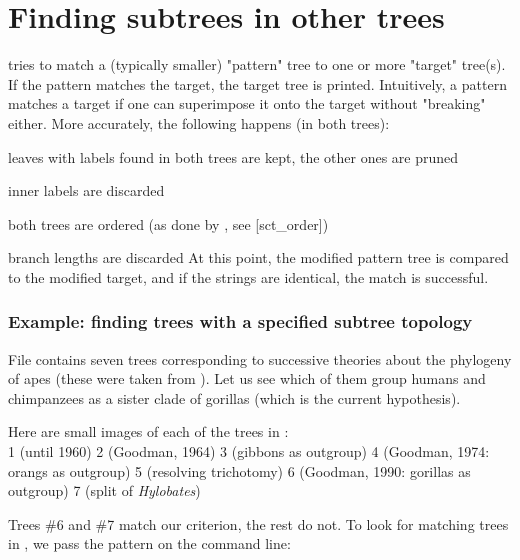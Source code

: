
\section[sct_match]{Finding subtrees in other trees}


\match{} tries to match a (typically smaller) "pattern" tree to one or more
"target" tree(s). If the pattern matches the target, the target tree is
printed. Intuitively, a pattern matches a target if one can superimpose it onto
the target without "breaking" either. More accurately, the following happens
(in both trees):
\startitemize[n]
	\item leaves with labels found in both trees are kept, the other ones are
		pruned
	\item inner labels are discarded
	\item both trees are ordered (as done by \order{}, see  \in{}[sct_order])
	\item branch lengths are discarded
\stopitemize
At this point, the modified pattern tree is compared to the modified target, and if the \nw{} strings are identical, the match is successful.

\subsubsection{Example: finding trees with a specified  subtree topology}

File  contains seven trees corresponding to successive
theories about the phylogeny of apes (these were taken from
). Let us see which of them group
humans and chimpanzees as a sister clade of gorillas (which is the current
hypothesis).

\page[no]
Here are small images of each of the trees in : \\

\startcombination[2*4]
{\externalfigure[homino_0][scale=700]} {1 (until 1960)}
{\externalfigure[homino_1][scale=700]} {2 (Goodman, 1964)}
{\externalfigure[homino_2][scale=700]} {3 (gibbons as outgroup)}
{\externalfigure[homino_3][scale=700]} {4 (Goodman, 1974: orangs as outgroup)}
{\externalfigure[homino_4][scale=700]} {5 (resolving trichotomy)}
{\externalfigure[homino_5][scale=700]} {6 (Goodman, 1990: gorillas as outgroup)}
{\externalfigure[homino_6][scale=700]} {7 (split of {\em Hylobates})}
\stopcombination

Trees \#6 and \#7 match our criterion, the rest do not. To look for matching trees in , we pass the pattern on the command line:


